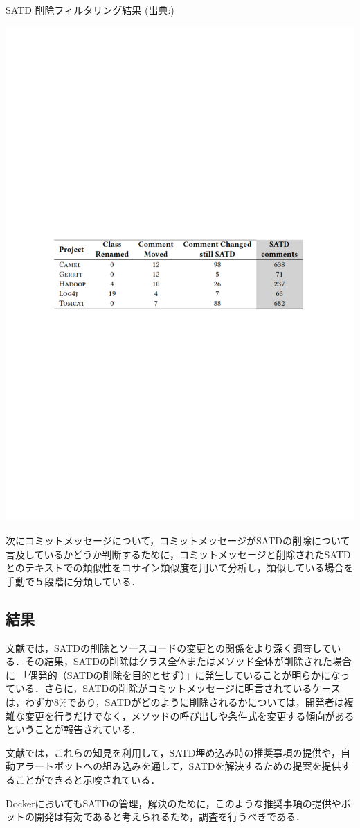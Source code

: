 \begin{table}[t]
    \centering
    \caption{SATD 削除フィルタリング結果 (出典:\cite{satd-real-removal})}
    \includegraphics[width=0.9\linewidth, angle=0]{./thesis2/satd-failer-alarm2.pdf}
    \label{fig:2_satd-failer-alarm}
\end{table}

次にコミットメッセージについて，コミットメッセージがSATDの削除について言及しているかどうか判断するために，コミットメッセージと削除されたSATDとのテキストでの類似性をコサイン類似度を用いて分析し，類似している場合を手動で５段階に分類している．

\subsection{結果}
文献\cite{satd-real-removal}では，SATDの削除とソースコードの変更との関係をより深く調査している．その結果，SATDの削除はクラス全体またはメソッド全体が削除された場合に 「偶発的（SATDの削除を目的とせず）」に発生していることが明らかになっている．さらに，SATDの削除がコミットメッセージに明言されているケースは，わずか8\%であり，SATDがどのように削除されるかについては，開発者は複雑な変更を行うだけでなく，メソッドの呼び出しや条件式を変更する傾向があるということが報告されている．

文献\cite{satd-real-removal}では，これらの知見を利用して，SATD埋め込み時の推奨事項の提供や，自動アラートボットへの組み込みを通して，SATDを解決するための提案を提供することができると示唆されている．

DockerにおいてもSATDの管理，解決のために，このような推奨事項の提供やボットの開発は有効であると考えられるため，調査を行うべきである．
